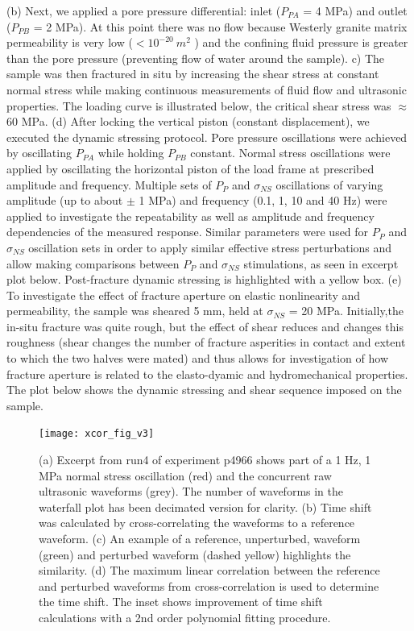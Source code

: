 \documentclass[letterpaper,10pt]{article}
\begin{document}
(b) Next, we applied a pore pressure differential: inlet ($P_{PA}$ = 4 MPa) and outlet ($P_{PB}$ = 2 MPa). At this point there was no flow because Westerly granite matrix permeability is very low ($< 10^{-20}\ m^2$ ) and the confining fluid pressure is greater than the pore pressure (preventing flow of water around the sample).
c) The sample was then fractured in situ by increasing the shear stress at constant normal stress while making continuous measurements of fluid flow and ultrasonic properties. The loading curve is illustrated below, the critical shear stress was $ \approx $60 MPa. 
(d) After locking the vertical piston (constant displacement), we executed the dynamic stressing protocol. Pore pressure oscillations were achieved by oscillating $P_{PA}$ while holding $P_{PB}$ constant. Normal stress oscillations were applied by oscillating the horizontal piston of the load frame at prescribed amplitude and frequency. Multiple sets of $P_{P}$ and $ \sigma_{NS} $ oscillations of varying amplitude (up to about $ \pm $ 1 MPa) and frequency (0.1, 1, 10 and 40 Hz) were applied to investigate the repeatability as well as amplitude and frequency dependencies of the measured response. Similar parameters were used for $P_{P}$ and $ \sigma_{NS} $ oscillation sets in order to apply similar effective stress perturbations and allow making comparisons between $P_{P}$ and $ \sigma_{NS} $ stimulations, as seen in excerpt plot below. Post-fracture dynamic stressing is highlighted with a yellow box. 
(e) To investigate the effect of fracture aperture on elastic nonlinearity and permeability, the sample was sheared 5 mm, held at $ \sigma_{NS} $ = 20 MPa. Initially,the in-situ fracture was quite rough, but the effect of shear reduces and changes this roughness (shear changes the number of fracture asperities in contact and extent to which the two halves were mated) and thus allows for investigation of how fracture aperture is related to the elasto-dyamic and hydromechanical properties. The plot below shows the dynamic stressing and shear sequence imposed on the sample.

\newpage

\begin{figure}[ht]
	\centering
	\texttt{[image: xcor\_fig\_v3]}
	\caption[]{(a) Excerpt from run4 of experiment p4966 shows part of a 1 Hz, 1 MPa normal stress oscillation (red) and the concurrent raw ultrasonic waveforms (grey). The number of waveforms in the waterfall plot has been decimated version for clarity. (b) Time shift was calculated by cross-correlating the waveforms to a reference waveform. (c) An example of a reference, unperturbed, waveform (green) and perturbed waveform (dashed yellow) highlights
		the similarity. (d) The maximum linear correlation between the reference and perturbed waveforms from cross-correlation is used to determine the time shift. The inset shows improvement of time shift calculations with a 2nd order polynomial fitting procedure.}
	\label{fig:xcor_poly}
\end{figure}
\end{document}
